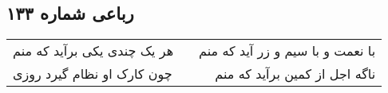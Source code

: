 \begin{center}
\section*{رباعی شماره ۱۳۳}
\label{sec:sh133}
\begin{longtable}{l p{0.5cm} r}
هر یک چندی یکی برآید که منم
&&
با نعمت و با سیم و زر آید که منم
\\
چون کارک او نظام گیرد روزی
&&
ناگه اجل از کمین برآید که منم
\\
\end{longtable}
\end{center}
